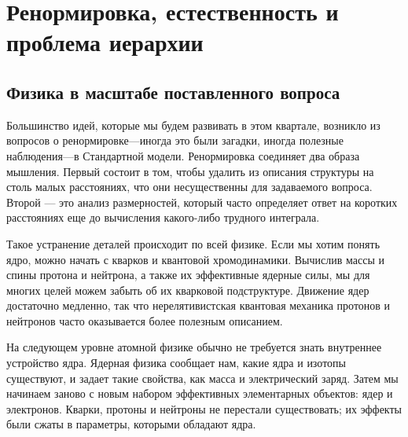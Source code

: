 \chapter{Ренормировка, естественность и проблема иерархии}


\section{Физика в масштабе поставленного вопроса}

Большинство идей, которые мы будем развивать в этом квартале, возникло из вопросов о ренормировке---иногда это были загадки, иногда полезные наблюдения---в Стандартной модели. Ренормировка соединяет два образа мышления. Первый состоит в том, чтобы удалить из описания структуры на столь малых расстояниях, что они несущественны для задаваемого вопроса. Второй — это анализ размерностей, который часто определяет ответ на коротких расстояниях еще до вычисления какого-либо трудного интеграла.

Такое устранение деталей происходит по всей физике. Если мы хотим понять ядро, можно начать с кварков и квантовой хромодинамики. Вычислив массы и спины протона и нейтрона, а также их эффективные ядерные силы, мы для многих целей можем забыть об их кварковой подструктуре. Движение ядер достаточно медленно, так что нерелятивистская квантовая механика протонов и нейтронов часто оказывается более полезным описанием.

На следующем уровне атомной физике обычно не требуется знать внутреннее устройство ядра. Ядерная физика сообщает нам, какие ядра и изотопы существуют, и задает такие свойства, как масса и электрический заряд. Затем мы начинаем заново с новым набором эффективных элементарных объектов: ядер и электронов. Кварки, протоны и нейтроны не перестали существовать; их эффекты были сжаты в параметры, которыми обладают ядра.

